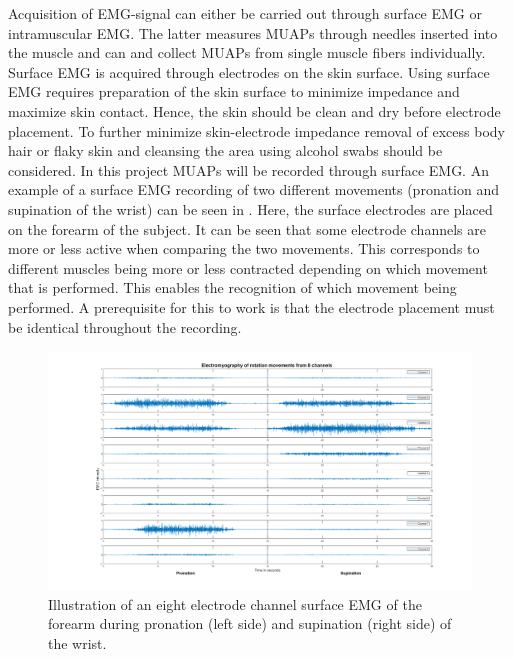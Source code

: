 Acquisition of EMG-signal can either be carried out through surface EMG or intramuscular EMG. The latter measures MUAPs through needles inserted into the muscle and can and collect MUAPs from single muscle fibers individually. Surface EMG is acquired through electrodes on the skin surface. \cite{Cram2012}  Using surface EMG requires preparation of the skin surface to minimize impedance and maximize skin contact. Hence, the skin should be clean and dry before electrode placement. To further minimize skin-electrode impedance removal of excess body hair or flaky skin and cleansing the area using alcohol swabs should be considered. \cite{Turker2013,Cram2012} In this project MUAPs will be recorded through surface EMG. An example of a surface EMG recording of two different movements (pronation and supination of the wrist) can be seen in . Here, the surface electrodes are placed on the forearm of the subject. It can be seen that some electrode channels are more or less active when comparing the two movements. This corresponds to different muscles being more or less contracted depending on which movement that is performed. This enables the recognition of which movement being performed. A prerequisite for this to work is that the electrode placement must be identical throughout the recording.

\begin{figure}[H]                 
	\includegraphics[width=.4\textwidth]{figures/Emg_rot}  
	\caption{Illustration of an eight electrode channel surface EMG of the forearm during pronation (left side) and supination (right side) of the wrist.}
	\label{fig:Emg_rot} 
\end{figure}

